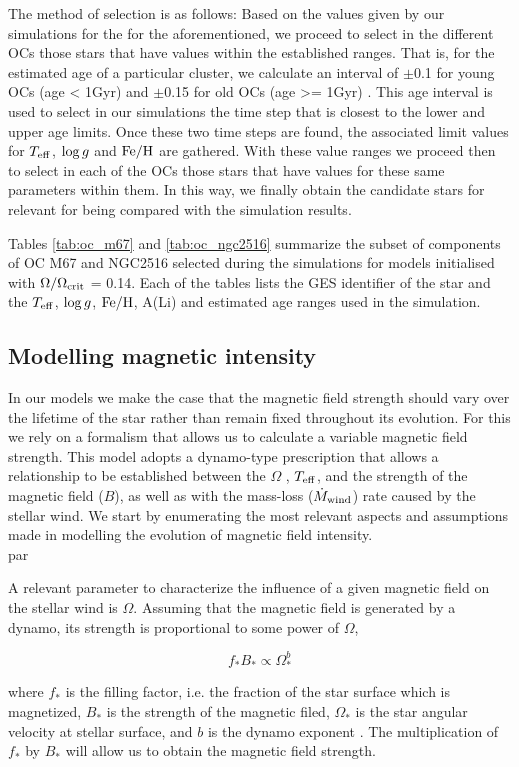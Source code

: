 \documentclass[fleqn,usenatbib]{mnras}
\begin{document}
The method of selection is as follows: Based on the values given by our simulations for the for the aforementioned, we proceed to select in the different OCs those stars that have values within the established ranges. That is, for the estimated age of a particular cluster, we calculate an interval of $\pm$0.1 for young OCs (age < 1Gyr) and $\pm$0.15 for old OCs (age >= 1Gyr) \citep[see][and reference values therein]{Cantat-Gaudin2020}. This age interval is used to select in our simulations the time step that is closest to the lower and upper age limits. Once these two time steps are found, the associated limit values for $T_{\mathrm{eff}}$, $\mathrm{log} \, g$ and $\mathrm{Fe}/\mathrm{H}$ are gathered. With these value ranges we proceed then to select in each of the OCs those stars that have values for these same parameters within them. In this way, we finally obtain the candidate stars for relevant for being compared with the simulation results.\par

Tables \ref{tab:oc_m67} and \ref{tab:oc_ngc2516} summarize the subset of components of OC M67 and NGC2516 selected during the simulations for models initialised with $\Omega / \Omega_{\mathrm{crit}}$ = 0.14. Each of the tables lists the GES identifier of the star and the $T_{\mathrm{eff}}$, $\mathrm{log} \, g$, $\mathrm{Fe}/\mathrm{H}$, A(Li) and estimated age ranges used in the simulation.


\subsection{Modelling magnetic intensity} \label{mod_mbi}
In our models we make the case that the magnetic field strength should vary over the lifetime of the star rather than remain fixed throughout its evolution. For this we rely on a formalism \citep{Gallet2013} that allows us to calculate a variable magnetic field strength. This model adopts a dynamo-type prescription that allows a relationship to be established between the $\Omega$ , $T_{\mathrm{eff}}$, and the strength of the magnetic field ($B$), as well as with the mass-loss ($\Dot{M}_{\mathrm{wind}}$) rate caused by the stellar wind. We start by enumerating the most relevant aspects and assumptions made in modelling the evolution of magnetic field intensity. \\par 

A relevant parameter to characterize the influence of a given magnetic field on the stellar wind is $\Omega$. Assuming that the magnetic field is generated by a dynamo, its strength is proportional to some power of $\Omega$,
\begin{ceqn}
\begin{equation}
    f_*B_* \propto \Omega_*^b \label{eq:mf_strenght}
\end{equation}
\end{ceqn}
where $f_*$ is the filling factor, i.e. the fraction of the star surface which is magnetized, $B_*$ is the strength of the magnetic filed, $\Omega_*$ is the star angular velocity at stellar surface, and $b$ is the dynamo exponent \citep{Gallet2013}. The multiplication of $f_*$ by $B_*$ will allow us to obtain the magnetic field strength. \par
\end{document}
